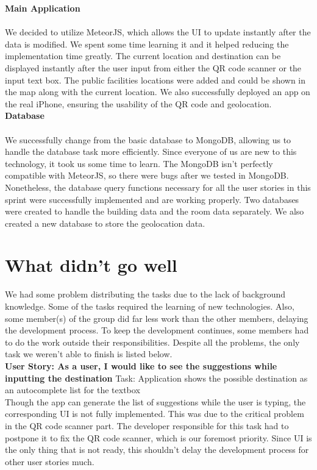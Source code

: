 \documentclass[12pt]{article}
\begin{document}
\textbf{Main Application} \\ \\
We decided to utilize MeteorJS, which allows the UI to update instantly after the data is modified. We spent some time learning it and it helped reducing the implementation time greatly. The current location and destination can be displayed instantly after the user input from either the QR code scanner or the input text box. The public facilities locations were added and could be shown in the map along with the current location. We also successfully deployed an app on the real iPhone, ensuring the usability of the QR code and geolocation. \\

\textbf{Database} \\ \\

We successfully change from the basic database to MongoDB, allowing us to handle the database task more efficiently. Since everyone of us are new to this technology, it took us some time to learn. The MongoDB isn’t perfectly compatible with MeteorJS, so there were bugs after we tested in MongoDB. Nonetheless, the database query functions necessary for all the user stories in this sprint were successfully implemented and are working properly. Two databases were created to handle the building data and the room data separately. We also created a new database to store the geolocation data.


\section{What didn't go well}


We had some problem distributing the tasks due to the lack of background knowledge. Some of the tasks required the learning of new technologies. Also, some member(s) of the group did far less work than the other members, delaying the development process. To keep the development continues, some members had to do the work outside their responsibilities. Despite all the problems, the only task we weren’t able to finish is listed below. \\

\textbf{User Story: As a user, I would like to see the suggestions while inputting the destination  }
Task: Application shows the possible destination as an autocomplete list for the textbox \\

Though the app can generate the list of suggestions while the user is typing, the corresponding UI is not fully implemented. This was due to the critical problem in the QR code scanner part. The developer responsible for this task had to postpone it to fix the QR code scanner, which is our foremost priority. Since UI is the only thing that is not ready, this shouldn’t delay the development process for other user stories much. 
\end{document}
